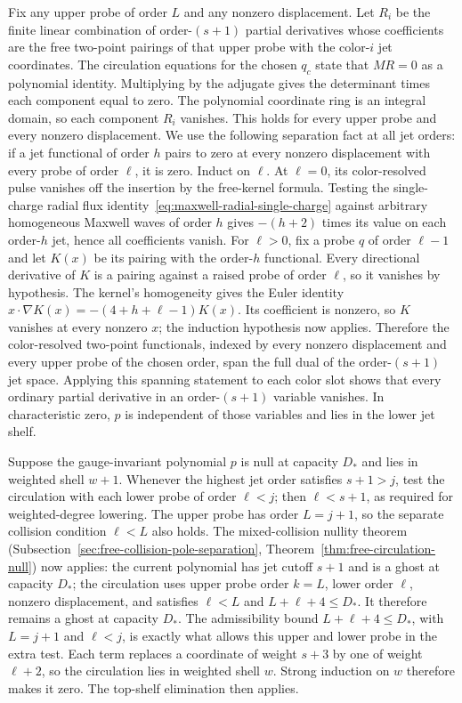 Fix any upper probe of order $L$ and any nonzero displacement.  Let
$R_i$ be the finite linear combination of order-$(s+1)$ partial
derivatives whose coefficients are the free two-point pairings of that
upper probe with the color-$i$ jet coordinates.  The circulation
equations for the chosen $q_c$ state that $M R=0$ as a polynomial
identity.  Multiplying by the adjugate gives the determinant times each
component equal to zero.  The polynomial coordinate ring is an integral
domain, so each component $R_i$ vanishes.  This holds for every upper
probe and every nonzero displacement.  We use the following separation
fact at all jet orders: if a jet functional of order $h$ pairs to zero at
every nonzero displacement with every probe of order $\ell$, it is zero.
Induct on $\ell$.  At $\ell=0$, its color-resolved pulse vanishes off the
insertion by the free-kernel formula.  Testing the single-charge radial
flux identity~\eqref{eq:maxwell-radial-single-charge} against arbitrary
homogeneous Maxwell waves of order $h$ gives $-(h+2)$ times its value on
each order-$h$ jet, hence all coefficients vanish.  For $\ell>0$, fix a
probe $q$ of order $\ell-1$ and let $K(x)$ be its pairing with the order-$h$
functional.  Every directional derivative of $K$ is a pairing against a
raised probe of order $\ell$, so it vanishes by hypothesis.  The kernel's
homogeneity gives the Euler identity
$x\cdot\nabla K(x)=-(4+h+\ell-1)K(x)$.  Its coefficient is nonzero,
so $K$ vanishes at every nonzero $x$; the induction hypothesis now applies.
Therefore the color-resolved two-point functionals,
indexed by every nonzero displacement and every upper probe of the chosen
order, span the full dual of the order-$(s+1)$ jet space.  Applying this
spanning statement to
each color slot shows that every ordinary partial derivative in an
order-$(s+1)$ variable vanishes.  In characteristic zero, $p$ is
independent of those variables and lies in the lower jet shelf.

Suppose the gauge-invariant polynomial $p$ is null at capacity $D_*$ and
lies in weighted shell
$w+1$.  Whenever the highest jet order satisfies $s+1>j$, test the circulation
with each lower probe of order $\ell<j$; then $\ell<s+1$, as required
for weighted-degree lowering.  The upper probe has order $L=j+1$, so the
separate collision condition $\ell<L$ also holds.  The mixed-collision nullity theorem
(Subsection~\ref{sec:free-collision-pole-separation},
Theorem~\ref{thm:free-circulation-null}) now applies: the current
polynomial has jet cutoff $s+1$ and is a ghost at capacity $D_*$; the
circulation uses upper probe order $k=L$, lower order $\ell$, nonzero
displacement, and satisfies $\ell<L$ and $L+\ell+4\le D_*$.  It
therefore remains a ghost at capacity $D_*$.  The admissibility bound
$L+\ell+4\leq D_*$, with $L=j+1$ and $\ell<j$, is exactly what allows
this upper and lower probe in the extra test.  Each term replaces a coordinate of weight $s+3$ by
one of weight $\ell+2$, so the circulation lies in weighted shell $w$.
Strong induction on $w$ therefore makes it zero.  The top-shelf
elimination then applies.

